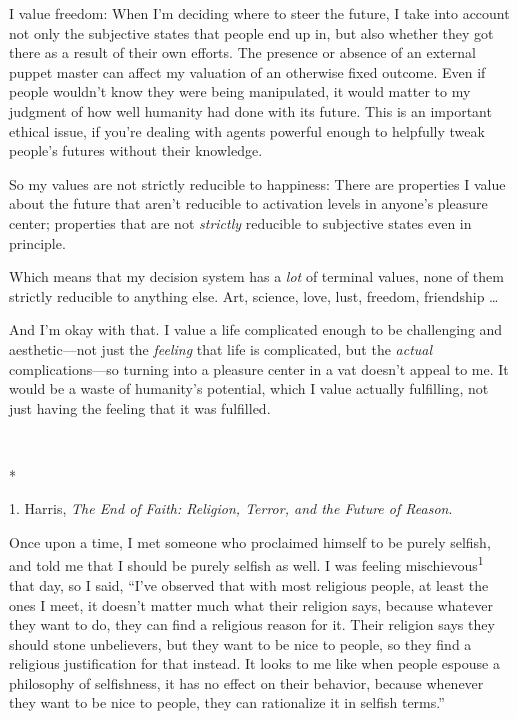 {
 I value freedom: When I'm deciding where to steer
the future, I take into account not only the subjective states that
people end up in, but also whether they got there as a result of their
own efforts. The presence or absence of an external puppet master can
affect my valuation of an otherwise fixed outcome. Even if people
wouldn't know they were being manipulated, it would
matter to my judgment of how well humanity had done with its future.
This is an important ethical issue, if you're dealing
with agents powerful enough to helpfully tweak people's
futures without their knowledge.}

{
 So my values are not strictly reducible to happiness: There are
properties I value about the future that aren't
reducible to activation levels in anyone's pleasure
center; properties that are not \textit{strictly} reducible to
subjective states even in principle.}

{
 Which means that my decision system has a \textit{lot} of terminal
values, none of them strictly reducible to anything else. Art, science,
love, lust, freedom, friendship \ldots}

{
 And I'm okay with that. I value a life complicated
enough to be challenging and aesthetic---not just the \textit{feeling}
that life is complicated, but the \textit{actual} complications---so
turning into a pleasure center in a vat doesn't appeal
to me. It would be a waste of humanity's potential,
which I value actually fulfilling, not just having the feeling that it
was fulfilled.}

{\centering
 \ ~
\par}

{\centering
 *
\par}


\bigskip

{
 1. Harris, \textit{The End of Faith: Religion, Terror, and the
Future of Reason}.}


{
 Once upon a time, I met someone who proclaimed himself to be
purely selfish, and told me that I should be purely selfish as well. I
was feeling mischievous\textsuperscript{1} that day, so I said,
``I've observed that with most
religious people, at least the ones I meet, it doesn't
matter much what their religion says, because whatever they want to do,
they can find a religious reason for it. Their religion says they
should stone unbelievers, but they want to be nice to people, so they
find a religious justification for that instead. It looks to me like
when people espouse a philosophy of selfishness, it has no effect on
their behavior, because whenever they want to be nice to people, they
can rationalize it in selfish terms.'' }

